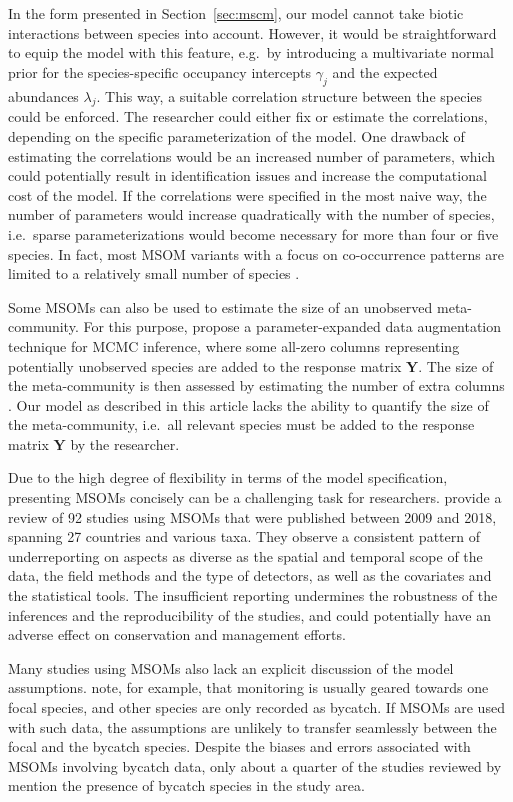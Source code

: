 \documentclass{article}
\newcommand{\Ymat}{\mathbf{Y}}
\begin{document}
In the form presented in Section~\ref{sec:mscm}, our model cannot take biotic interactions between species into account. However, it would be straightforward to equip the model with this feature, e.g.~by introducing a multivariate normal prior for the species-specific occupancy intercepts $\gamma_j$ and the expected abundances $\lambda_j$. This way, a suitable correlation structure between the species could be enforced. The researcher could either fix or estimate the correlations, depending on the specific parameterization of the model. One drawback of estimating the correlations would be an increased number of parameters, which could potentially result in identification issues and increase the computational cost of the model. If the correlations were specified in the most naive way, the number of parameters would increase quadratically with the number of species, i.e.~sparse parameterizations would become necessary for more than four or five species. In fact, most MSOM variants with a focus on co-occurrence patterns are limited to a relatively small number of species \citep{devarajanMultispecies2020}.

Some MSOMs can also be used to estimate the size of an unobserved meta-community. For this purpose, \citet{dorazioEstimating2005} propose a parameter-expanded data augmentation technique for MCMC inference, where some all-zero columns representing potentially unobserved species are added to the response matrix $\Ymat$. The size of the meta-community is then assessed by estimating the number of extra columns \citep{keryBayesian2012}. Our model as described in this article lacks the ability to quantify the size of the meta-community, i.e.~all relevant species must be added to the response matrix $\Ymat$ by the researcher.

Due to the high degree of flexibility in terms of the model specification, presenting MSOMs concisely can be a challenging task for researchers. \citet{devarajanMultispecies2020} provide a review of 92 studies using MSOMs that were published between 2009 and 2018, spanning 27 countries and various taxa. They observe a consistent pattern of underreporting on aspects as diverse as the spatial and temporal scope of the data, the field methods and the type of detectors, as well as the covariates and the statistical tools. The insufficient reporting undermines the robustness of the inferences and the reproducibility of the studies, and could potentially have an adverse effect on conservation and management efforts.

Many studies using MSOMs also lack an explicit discussion of the model assumptions. \citet{devarajanMultispecies2020} note, for example, that monitoring is usually geared towards one focal species, and other species are only recorded as bycatch. If MSOMs are used with such data, the assumptions are unlikely to transfer seamlessly between the focal and the bycatch species. Despite the biases and errors associated with MSOMs involving bycatch data, only about a quarter of the studies reviewed by \citeauthor{devarajanMultispecies2020} mention the presence of bycatch species in the study area.
\end{document}
